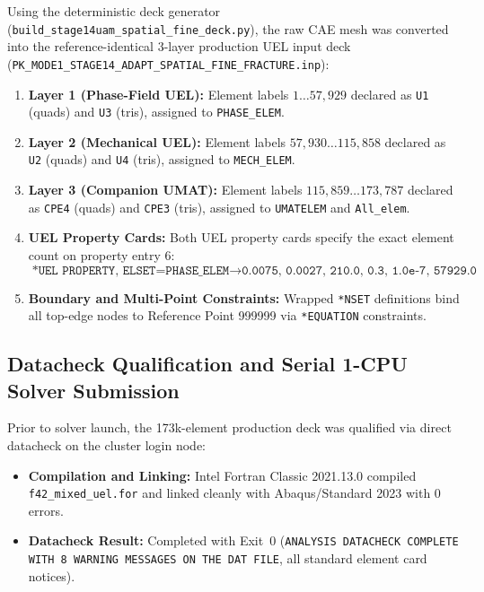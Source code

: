 Using the deterministic deck generator (\texttt{build\_stage14uam\_spatial\_fine\_deck.py}), the raw CAE mesh was converted into the reference-identical 3-layer production UEL input deck (\texttt{PK\_MODE1\_STAGE14\_ADAPT\_SPATIAL\_FINE\_FRACTURE.inp}):
\begin{enumerate}
  \item \textbf{Layer 1 (Phase-Field UEL):} Element labels $1 \dots 57,929$ declared as \texttt{U1} (quads) and \texttt{U3} (tris), assigned to \texttt{PHASE\_ELEM}.
  \item \textbf{Layer 2 (Mechanical UEL):} Element labels $57,930 \dots 115,858$ declared as \texttt{U2} (quads) and \texttt{U4} (tris), assigned to \texttt{MECH\_ELEM}.
  \item \textbf{Layer 3 (Companion UMAT):} Element labels $115,859 \dots 173,787$ declared as \texttt{CPE4} (quads) and \texttt{CPE3} (tris), assigned to \texttt{UMATELEM} and \texttt{All\_elem}.
  \item \textbf{UEL Property Cards:} Both UEL property cards specify the exact element count on property entry 6:
  \begin{equation}
    \texttt{*UEL PROPERTY, ELSET=PHASE\_ELEM} \rightarrow \texttt{0.0075, 0.0027, 210.0, 0.3, 1.0e-7, 57929.0}
  \end{equation}
  \item \textbf{Boundary and Multi-Point Constraints:} Wrapped \texttt{*NSET} definitions bind all top-edge nodes to Reference Point 999999 via \texttt{*EQUATION} constraints.
\end{enumerate}

\subsection{Datacheck Qualification and Serial 1-CPU Solver Submission}
\label{subsec:stage14uam_datacheck_and_submission}

Prior to solver launch, the 173k-element production deck was qualified via direct datacheck on the cluster login node:
\begin{itemize}
  \item \textbf{Compilation and Linking:} Intel Fortran Classic 2021.13.0 compiled \texttt{f42\_mixed\_uel.for} and linked cleanly with Abaqus/Standard 2023 with 0 errors.
  \item \textbf{Datacheck Result:} Completed with Exit~0 (\texttt{ANALYSIS DATACHECK COMPLETE WITH 8 WARNING MESSAGES ON THE DAT FILE}, all standard element card notices).
\end{itemize}

